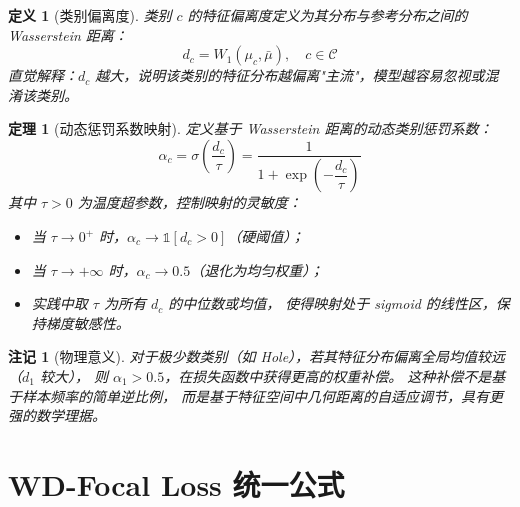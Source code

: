 \documentclass[12pt, a4paper]{ctexart}
\newtheorem{definition}{定义}[section]
\newtheorem{theorem}{定理}[section]
\newtheorem{remark}{注记}[section]
\begin{document}
\begin{definition}[类别偏离度]
类别 $c$ 的特征偏离度定义为其分布与参考分布之间的 Wasserstein 距离：
\begin{equation}
    d_c = W_1(\mu_c, \bar{\mu}), \quad c \in \mathcal{C}
    \label{eq:deviation}
\end{equation}
直觉解释：$d_c$ 越大，说明该类别的特征分布越偏离"主流"，模型越容易忽视或混淆该类别。
\end{definition}

\begin{theorem}[动态惩罚系数映射]
\label{thm:dynamic_alpha}
定义基于 Wasserstein 距离的动态类别惩罚系数：
\begin{equation}
    \alpha_c = \sigma\!\left(\frac{d_c}{\tau}\right)
    = \frac{1}{1 + \exp\!\left(-\dfrac{d_c}{\tau}\right)}
    \label{eq:alpha_mapping}
\end{equation}
其中 $\tau > 0$ 为温度超参数，控制映射的灵敏度：
\begin{itemize}
    \item 当 $\tau \to 0^+$ 时，$\alpha_c \to \mathbb{1}[d_c > 0]$（硬阈值）；
    \item 当 $\tau \to +\infty$ 时，$\alpha_c \to 0.5$（退化为均匀权重）；
    \item 实践中取 $\tau$ 为所有 $d_c$ 的中位数或均值，
          使得映射处于 sigmoid 的线性区，保持梯度敏感性。
\end{itemize}
\end{theorem}

\begin{remark}[物理意义]
对于极少数类别（如 Hole），若其特征分布偏离全局均值较远（$d_1$ 较大），
则 $\alpha_1 > 0.5$，在损失函数中获得更高的权重补偿。
这种补偿不是基于样本频率的简单逆比例，
而是基于特征空间中几何距离的自适应调节，具有更强的数学理据。
\end{remark}

\section{WD-Focal Loss 统一公式}
\end{document}
